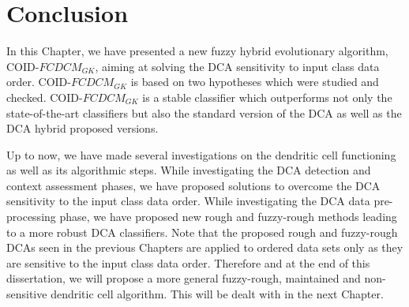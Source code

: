 \section{Conclusion}
In this Chapter, we have presented  a new fuzzy hybrid evolutionary algorithm, COID-$FCDCM_{GK}$, aiming at solving the DCA sensitivity to input class data order. COID-$FCDCM_{GK}$  is based on two hypotheses which were studied and checked. COID-$FCDCM_{GK}$ is a stable classifier which outperforms not only the state-of-the-art classifiers but also the standard version of the DCA as well as the DCA hybrid proposed versions.  

Up to now, we have made several investigations on the dendritic cell functioning as well as its algorithmic steps. While investigating the DCA detection and context assessment phases, we have proposed solutions to overcome the DCA sensitivity to the input class data order. While investigating the DCA data pre-processing phase, we have proposed new rough and fuzzy-rough methods leading to a more robust DCA classifiers. Note that the proposed rough and fuzzy-rough DCAs seen in the previous Chapters  are applied to ordered data sets only as they are sensitive to the input class data order. Therefore and at the end of this dissertation, we will propose a more general   fuzzy-rough, maintained  and  non-sensitive dendritic cell algorithm. This will be dealt with in the next Chapter.
